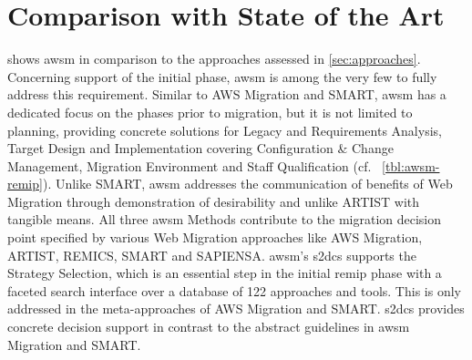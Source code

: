 \vspace{-15pt}
\hypertarget{comparison-with-state-of-the-art}{%
\section{Comparison with State of the Art}\label{comparison-with-state-of-the-art}}
\vspace{15pt}

 shows \gls{awsm} in comparison to the approaches assessed in \cref{sec:approaches}.
Concerning support of the initial phase, \gls{awsm} is among the very few to fully address this requirement.
Similar to AWS Migration and SMART, \gls{awsm} has a dedicated focus on the phases prior to migration, but it is not limited to planning, providing concrete solutions for Legacy and Requirements Analysis, Target Design and Implementation covering Configuration \& Change Management, Migration Environment and Staff Qualification (cf.~ \cref{tbl:awsm-remip}).
Unlike SMART, \gls{awsm} addresses the communication of benefits of \gls{Web Migration} through demonstration of desirability and unlike ARTIST with tangible means.
All three \gls{awsm} Methods contribute to the migration decision point specified by various \gls{Web Migration} approaches like AWS Migration, ARTIST, REMICS, SMART and SAPIENSA.
\gls{awsm}'s \gls{s2dcs} supports the Strategy Selection, which is an essential step in the initial \gls{remip} phase with a faceted search interface over a database of 122 approaches and tools.
This is only addressed in the meta-approaches of AWS Migration and SMART. \gls{s2dcs} provides concrete decision support in contrast to the abstract guidelines in \gls{awsm} Migration and SMART.

